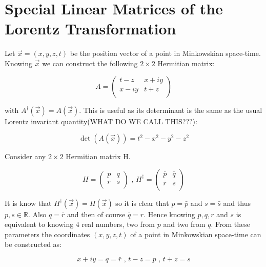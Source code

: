 \section{Special Linear Matrices of the Lorentz Transformation}\label{Special_Linear_Matrices_of_Lorentz}

Let $\vec{x} = (x,y,z,t)$ be the position vector of a point in Minkowskian space-time. Knowing $\vec{x}$ we can construct the following $2 \times 2$ Hermitian matrix:

\begin{equation}\label{Special_Matrices_A_first}
A = 
\left( 
\begin{array}{cc}
t-z    & x + i y \\
x - iy & t+z \\
\end{array} 
\right)  
\end{equation}

\noindent with $A^{\dagger}(\vec{x}) = A(\vec{x})$. This is useful as its determinant is the same as the usual Lorentz invariant quantity(WHAT DO WE CALL THIS???):

\begin{equation*}
\det(A(\vec{x})) = t^2 - x^2 - y^2 - z^2
\end{equation*}

Consider any $2 \times 2$ Hermitian matrix H. 

\begin{equation*}
H = \left( \begin{array}{cc}
p & q \\
r & s \\
\end{array} \right) \text{ ,     }
H^{\dagger} = \left( \begin{array}{cc}
\bar{p} & \bar{q} \\
\bar{r} & \bar{s} \\
\end{array} \right)
\end{equation*}

\noindent It is know that $H^{\dagger}(\vec{x}) = H(\vec{x})$ so it is clear that $p = \bar{p}$ and $s = \bar{s}$ and thus $p,s \in \mathbb{R}$. Also $q = \bar{r}$ and then of course $\bar{q} = r$. Hence knowing $p,q,r$ and $s$ is equivalent to knowing $4$ real numbers, two from $p$ and two from $q$. From these parameters the coordinates $(x,y,z,t)$ of a point in Minkowskian space-time can be constructed as:

\begin{equation*}
x + iy = q = \bar{r} \text{ ,   } t - z = p \text{ ,   } t+z = s
\end{equation*}

